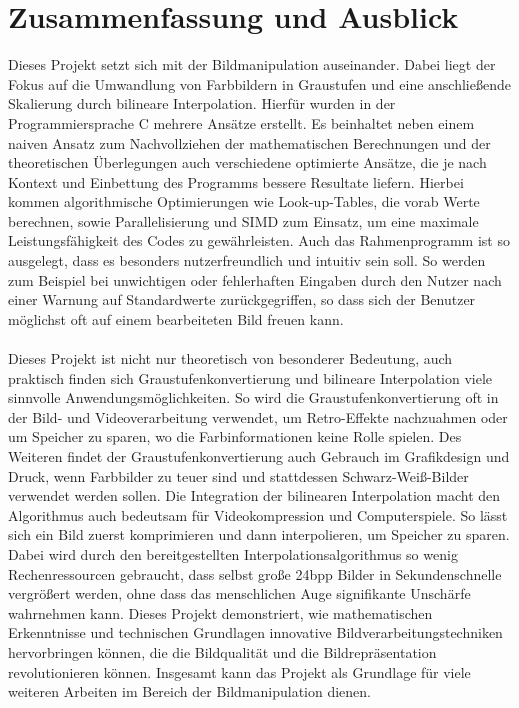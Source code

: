 \documentclass[course=erap]{aspdoc}
\begin{document}
\section{Zusammenfassung und Ausblick}
Dieses Projekt setzt sich mit der Bildmanipulation auseinander. Dabei liegt der Fokus auf die Umwandlung von Farbbildern in Graustufen und eine anschließende Skalierung durch bilineare Interpolation. Hierfür wurden in der Programmiersprache C mehrere Ansätze erstellt. Es beinhaltet neben einem naiven Ansatz zum Nachvollziehen der mathematischen Berechnungen und der theoretischen Überlegungen auch verschiedene optimierte Ansätze, die je nach Kontext und Einbettung des Programms bessere Resultate liefern. Hierbei kommen algorithmische Optimierungen wie Look-up-Tables, die vorab Werte berechnen, sowie Parallelisierung und SIMD zum Einsatz, um eine maximale Leistungsfähigkeit des Codes zu gewährleisten. Auch das Rahmenprogramm ist so ausgelegt, dass es besonders nutzerfreundlich und intuitiv sein soll. So werden zum Beispiel bei unwichtigen oder fehlerhaften Eingaben durch den Nutzer nach einer Warnung auf Standardwerte zurückgegriffen, so dass sich der Benutzer möglichst oft auf einem bearbeiteten Bild freuen kann.\\\\
Dieses Projekt ist nicht nur theoretisch von besonderer Bedeutung, auch praktisch finden sich Graustufenkonvertierung und bilineare Interpolation viele sinnvolle Anwendungsmöglichkeiten. So wird die Graustufenkonvertierung oft in der Bild- und Videoverarbeitung verwendet, um Retro-Effekte nachzuahmen oder um Speicher zu sparen, wo die Farbinformationen keine Rolle spielen. Des Weiteren findet der Graustufenkonvertierung auch Gebrauch im Grafikdesign und Druck, wenn Farbbilder zu teuer sind und stattdessen Schwarz-Weiß-Bilder verwendet werden sollen. Die Integration der bilinearen Interpolation macht den Algorithmus auch bedeutsam für Videokompression und Computerspiele. So lässt sich ein Bild zuerst komprimieren und dann interpolieren, um Speicher zu sparen. Dabei wird durch den bereitgestellten Interpolationsalgorithmus so wenig Rechenressourcen gebraucht, dass selbst große 24bpp Bilder in Sekundenschnelle vergrößert werden, ohne dass das menschlichen Auge signifikante Unschärfe wahrnehmen kann.
Dieses Projekt demonstriert, wie mathematischen Erkenntnisse und technischen Grundlagen innovative Bildverarbeitungstechniken hervorbringen können, die die Bildqualität und die Bildrepräsentation revolutionieren können. Insgesamt kann das Projekt als Grundlage für viele weiteren Arbeiten im Bereich der Bildmanipulation dienen.


{

\cite{ece472}
\cite{ppm}
\cite{ppmformats}
\cite{pgmpgmpbm}

}
\end{document}
